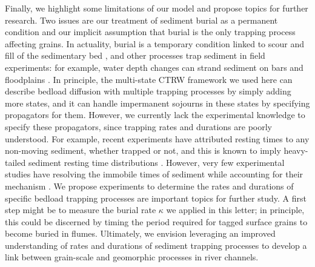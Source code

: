 \documentclass[]{agujournal2018}
\begin{document}
Finally, we highlight some limitations of our model and propose topics for further research.
Two issues are our treatment of sediment burial as a permanent condition and  our implicit assumption that burial is the only trapping process affecting grains.
In actuality, burial is a temporary condition linked to scour and fill of the sedimentary bed \citep{Hassan1994,Ferguson2002a,Voepel2013,Martin2014}, and other processes trap sediment in field experiments: for example, water depth changes can strand sediment on bars and floodplains \citep[e.g.][]{Ferguson2002a, Bradley2017, Malmon2003}.
In principle, the multi-state CTRW framework we used here can describe bedload diffusion with multiple trapping processes by simply adding more states, and it can handle impermanent sojourns in these states by specifying propagators for them.
However, we currently lack the experimental knowledge to specify these propagators, since trapping rates and durations are poorly understood.
For example, recent experiments have attributed resting times to any non-moving sediment, whether trapped or not, and this is known to imply heavy-tailed sediment resting time distributions \citep[e.g.][]{Olinde2015,Bradley2017}.
However, very few experimental studies have resolving the immobile times of sediment while accounting for their mechanism \citep[e.g.][]{Martin2014}.
We propose experiments to determine the rates and durations of specific bedload trapping processes are important topics for further study.
A first step might be to measure the burial rate $\kappa$ we applied in this letter; in principle, this could be discerned by timing the period required for tagged surface grains to become buried in flumes.
Ultimately, we envision leveraging an improved understanding of rates and durations of sediment trapping processes to develop a link between grain-scale and geomorphic processes in river channels.
\end{document}
